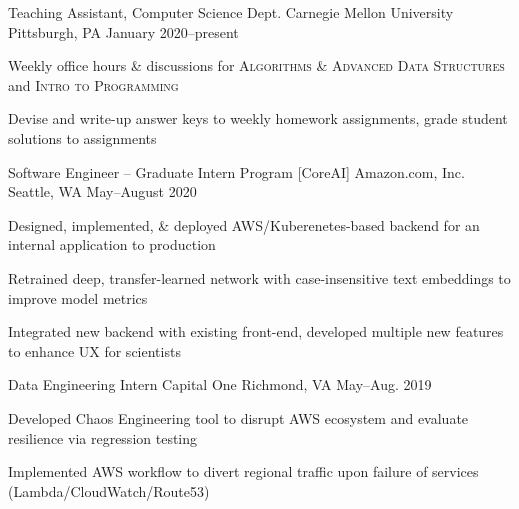 \documentclass[10pt, letterpaper]{awesome-cv}
\begin{document}
\begin{cventries}

    \cventry
        {Teaching Assistant, Computer Science Dept.}
        {Carnegie Mellon University}
        {Pittsburgh, PA}
        {January 2020--present}
        {\begin{cvitems} 
            \item Weekly office hours \& discussions for {\bodyfont\scshape\color{darktext} Algorithms \& Advanced Data Structures} and {\bodyfont\scshape\color{darktext} Intro to Programming} 
            \item Devise and write-up answer keys to weekly homework assignments, grade student solutions to assignments 
        \end{cvitems}}   
        
        \cventry
        {Software Engineer -- Graduate Intern Program [CoreAI]}
        {Amazon.com, Inc.}
        {Seattle, WA}
        {May--August 2020}
        {\begin{cvitems} 
            \item Designed, implemented, \& deployed AWS/Kuberenetes-based backend for an internal application to production
            \item Retrained deep, transfer-learned network with case-insensitive text embeddings to improve model metrics
            \item Integrated new backend with existing front-end, developed multiple new features to enhance UX for scientists
        \end{cvitems}}
        
    
    \cventry
        {Data Engineering Intern}
        {Capital One}
        {Richmond, VA}
        {May--Aug. 2019}
        {\begin{cvitems} 
            \item Developed Chaos Engineering tool to disrupt AWS ecosystem and evaluate resilience via regression testing 
            \item Implemented AWS workflow to divert regional traffic upon failure of services (Lambda/CloudWatch/Route53)
        \end{cvitems}}
        

\end{cventries}
\end{document}
